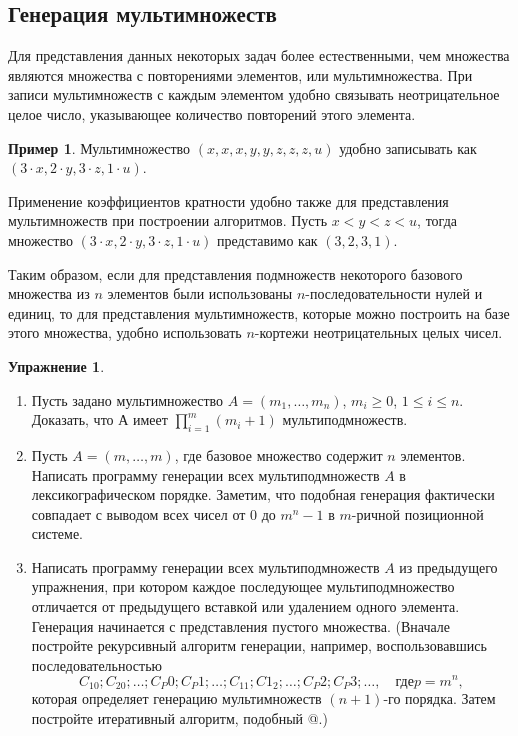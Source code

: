 \documentclass[12pt,a4paper]{article}
\theoremstyle{plain}
\theoremstyle{definition}
\newtheorem*{task}{Упражнение}
\newtheorem*{example}{Пример}
\theoremstyle{remark}
\newtheorem*{comment}{Комментарий}
\begin{document}
\begin{comment}
Добавление в массивы $t$ и $s$ $n+1$-х элементов сделано для того, чтобы сократить число проверок внутри цикла \verb@{1}@.
\end{comment}

\subsection{Генерация мультимножеств}

Для представления данных некоторых задач более естественными, чем множества являются множества с повторениями элементов, или мультимножества. При записи мультимножеств с каждым элементом удобно связывать неотрицательное целое число, указывающее количество повторений этого элемента.

\begin{example}
Мультимножество $(x, x, x, y, y, z, z, z, u)$ удобно записывать как $(3\cdot x, 2\cdot y, 3\cdot z, 1\cdot u)$.
\end{example}

Применение коэффициентов кратности удобно также для представления мультимножеств при построении алгоритмов. Пусть $x<y<z<u$, тогда множество $(3\cdot x, 2\cdot y, 3\cdot z, 1\cdot u)$ представимо как $(3,2,3,1)$.

Таким образом, если для представления подмножеств некоторого базового множества из $n$ элементов были использованы $n$-последовательности нулей и единиц, то для представления мультимножеств, которые можно построить на базе этого множества, удобно использовать $n$-кортежи неотрицательных целых чисел.

\begin{task}
~\\
\begin{enumerate}
\item Пусть задано мультимножество $A=(m_1,\ldots,m_n)$, $m_i\ge0$, $1\le i\le n$. Доказать, что А имеет $\prod_{i=1}^m (m_i + 1)$ мультиподмножеств.
\item Пусть $A=(m,\ldots,m)$, где базовое множество содержит $n$ элементов. Написать программу генерации всех мультиподмножеств $A$ в лексикографическом порядке. Заметим, что подобная генерация фактически совпадает с выводом всех чисел от $0$ до $m^n-1$ в $m$-ричной позиционной системе.
\item Написать программу генерации всех мультиподмножеств $A$ из предыдущего упражнения, при котором каждое последующее мультиподмножество отличается от предыдущего вставкой или удалением одного элемента. Генерация начинается с представления пустого множества. (Вначале постройте рекурсивный алгоритм генерации, например, воспользовавшись последовательностью
\[ C_10; C_20; \ldots; C_P0; C_P1; \ldots; C_11; C1_2; \ldots; C_P2; C_P3;\ldots, \quad \text{где} p=m^n, \]
которая определяет генерацию мультимножеств $(n+1)$-го порядка. Затем постройте итеративный алгоритм, подобный @.)
\end{enumerate}
\end{task}
\end{document}
